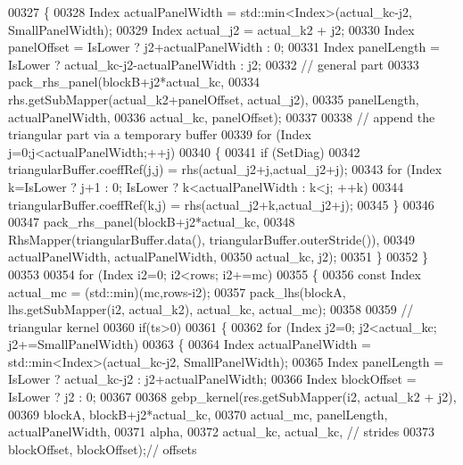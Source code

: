 \begin{DoxyCode}
00327         \{
00328           Index actualPanelWidth = std::min<Index>(actual\_kc-j2, SmallPanelWidth);
00329           Index actual\_j2 = actual\_k2 + j2;
00330           Index panelOffset = IsLower ? j2+actualPanelWidth : 0;
00331           Index panelLength = IsLower ? actual\_kc-j2-actualPanelWidth : j2;
00332           \textcolor{comment}{// general part}
00333           pack\_rhs\_panel(blockB+j2*actual\_kc,
00334                          rhs.getSubMapper(actual\_k2+panelOffset, actual\_j2),
00335                          panelLength, actualPanelWidth,
00336                          actual\_kc, panelOffset);
00337 
00338           \textcolor{comment}{// append the triangular part via a temporary buffer}
00339           \textcolor{keywordflow}{for} (Index j=0;j<actualPanelWidth;++j)
00340           \{
00341             \textcolor{keywordflow}{if} (SetDiag)
00342               triangularBuffer.coeffRef(j,j) = rhs(actual\_j2+j,actual\_j2+j);
00343             \textcolor{keywordflow}{for} (Index k=IsLower ? j+1 : 0; IsLower ? k<actualPanelWidth : k<j; ++k)
00344               triangularBuffer.coeffRef(k,j) = rhs(actual\_j2+k,actual\_j2+j);
00345           \}
00346 
00347           pack\_rhs\_panel(blockB+j2*actual\_kc,
00348                          RhsMapper(triangularBuffer.data(), triangularBuffer.outerStride()),
00349                          actualPanelWidth, actualPanelWidth,
00350                          actual\_kc, j2);
00351         \}
00352       \}
00353 
00354       \textcolor{keywordflow}{for} (Index i2=0; i2<rows; i2+=mc)
00355       \{
00356         \textcolor{keyword}{const} Index actual\_mc = (std::min)(mc,rows-i2);
00357         pack\_lhs(blockA, lhs.getSubMapper(i2, actual\_k2), actual\_kc, actual\_mc);
00358 
00359         \textcolor{comment}{// triangular kernel}
00360         \textcolor{keywordflow}{if}(ts>0)
00361         \{
00362           \textcolor{keywordflow}{for} (Index j2=0; j2<actual\_kc; j2+=SmallPanelWidth)
00363           \{
00364             Index actualPanelWidth = std::min<Index>(actual\_kc-j2, SmallPanelWidth);
00365             Index panelLength = IsLower ? actual\_kc-j2 : j2+actualPanelWidth;
00366             Index blockOffset = IsLower ? j2 : 0;
00367 
00368             gebp\_kernel(res.getSubMapper(i2, actual\_k2 + j2),
00369                         blockA, blockB+j2*actual\_kc,
00370                         actual\_mc, panelLength, actualPanelWidth,
00371                         alpha,
00372                         actual\_kc, actual\_kc,  \textcolor{comment}{// strides}
00373                         blockOffset, blockOffset);\textcolor{comment}{// offsets}

\end{DoxyCode}
